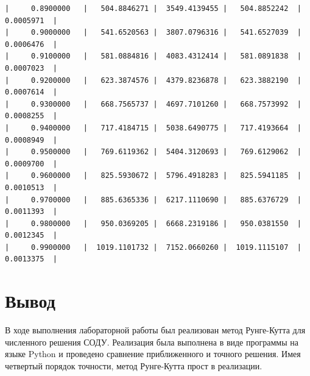 \documentclass[14pt, russian]{scrartcl}
\begin{document}
\begin{verbatim}
|     0.8900000   |   504.8846271 |  3549.4139455 |   504.8852242  |     0.0005971  |
|     0.9000000   |   541.6520563 |  3807.0796316 |   541.6527039  |     0.0006476  |
|     0.9100000   |   581.0884816 |  4083.4312414 |   581.0891838  |     0.0007023  |
|     0.9200000   |   623.3874576 |  4379.8236878 |   623.3882190  |     0.0007614  |
|     0.9300000   |   668.7565737 |  4697.7101260 |   668.7573992  |     0.0008255  |
|     0.9400000   |   717.4184715 |  5038.6490775 |   717.4193664  |     0.0008949  |
|     0.9500000   |   769.6119362 |  5404.3120693 |   769.6129062  |     0.0009700  |
|     0.9600000   |   825.5930672 |  5796.4918283 |   825.5941185  |     0.0010513  |
|     0.9700000   |   885.6365336 |  6217.1110690 |   885.6376729  |     0.0011393  |
|     0.9800000   |   950.0369205 |  6668.2319186 |   950.0381550  |     0.0012345  |
|     0.9900000   |  1019.1101732 |  7152.0660260 |  1019.1115107  |     0.0013375  |
  \end{verbatim}

\section{Вывод}

В ходе выполнения лабораторной работы был реализован метод Рунге-Кутта для
численного решения СОДУ. Реализация была выполнена в виде программы на языке
Python и проведено сравнение приближенного и точного решения. Имея четвертый
порядок точности, метод Рунге-Кутта прост в реализации.
\end{document}
